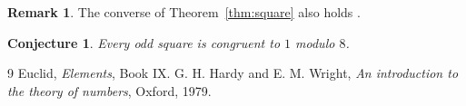\documentclass[11pt]{amsart}
\theoremstyle{plain}
\newtheorem{conjecture}[theorem]{Conjecture}
\theoremstyle{definition}
\newtheorem*{remark}{Remark}
\begin{document}
\begin{remark}
The converse of Theorem~\ref{thm:square} also holds \cite{hardywright}.
\end{remark}

\begin{conjecture}\label{conj:odd}
Every odd square is congruent to $1$ modulo $8$.
\end{conjecture}

\begin{thebibliography}{9}
 Euclid, \emph{Elements}, Book IX.
 G. H. Hardy and E. M. Wright, \emph{An introduction to the theory of numbers}, Oxford, 1979.
\end{thebibliography}
\end{document}
